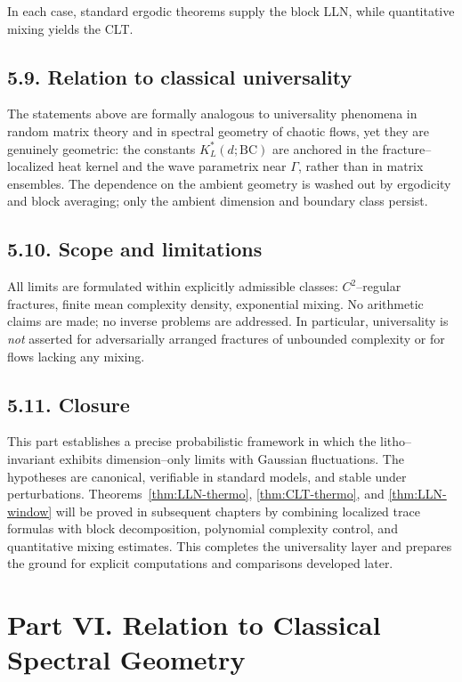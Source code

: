In each case, standard ergodic theorems supply the block LLN, while quantitative mixing yields the CLT.

\subsection*{5.9. Relation to classical universality}
The statements above are formally analogous to universality phenomena in random matrix theory and in spectral geometry of chaotic flows, yet they are genuinely geometric: the constants $K^*_L(d;\mathrm{BC})$ are anchored in the fracture–localized heat kernel and the wave parametrix near $\Gamma$, rather than in matrix ensembles. The dependence on the ambient geometry is washed out by ergodicity and block averaging; only the ambient dimension and boundary class persist.

\subsection*{5.10. Scope and limitations}
All limits are formulated within explicitly admissible classes: $C^2$–regular fractures, finite mean complexity density, exponential mixing. No arithmetic claims are made; no inverse problems are addressed. In particular, universality is \emph{not} asserted for adversarially arranged fractures of unbounded complexity or for flows lacking any mixing.

\subsection*{5.11. Closure}
This part establishes a precise probabilistic framework in which the litho–invariant exhibits dimension–only limits with Gaussian fluctuations. The hypotheses are canonical, verifiable in standard models, and stable under perturbations. Theorems~\ref{thm:LLN-thermo}, \ref{thm:CLT-thermo}, and \ref{thm:LLN-window} will be proved in subsequent chapters by combining localized trace formulas with block decomposition, polynomial complexity control, and quantitative mixing estimates. This completes the universality layer and prepares the ground for explicit computations and comparisons developed later.

\section*{Part VI. Relation to Classical Spectral Geometry}

